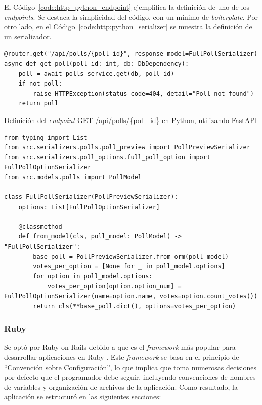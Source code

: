 \documentclass[11pt]{article}
\let\Oldsubsubsection\subsubsection
\renewcommand{\subsubsection}{\FloatBarrier\Oldsubsubsection}
\newcommand{\english}[1]{\textit{#1}}
\begin{document}
El Código~\ref{code:http_python_endpoint} ejemplifica la definición de uno de los \english{endpoints}. Se destaca la simplicidad del código, con un mínimo de \english{boilerplate}. Por otro lado, en el Código~\ref{code:http:python_serializer} se muestra la definición de un serializador.

\begin{listing}[h]
\begin{verbatim}
@router.get("/api/polls/{poll_id}", response_model=FullPollSerializer)
async def get_poll(poll_id: int, db: DbDependency):
    poll = await polls_service.get(db, poll_id)
    if not poll:
        raise HTTPException(status_code=404, detail="Poll not found")
    return poll
\end{verbatim}
\caption{Definición del \english{endpoint} GET /api/polls/\{poll\_id\} en Python, utilizando FastAPI}
\label{code:http_python_endpoint}
\end{listing}

\begin{listing}[h]
\begin{verbatim}
from typing import List
from src.serializers.polls.poll_preview import PollPreviewSerializer
from src.serializers.poll_options.full_poll_option import FullPollOptionSerializer
from src.models.polls import PollModel

class FullPollSerializer(PollPreviewSerializer):
    options: List[FullPollOptionSerializer]

    @classmethod
    def from_model(cls, poll_model: PollModel) -> "FullPollSerializer":
        base_poll = PollPreviewSerializer.from_orm(poll_model)
        votes_per_option = [None for _ in poll_model.options]
        for option in poll_model.options:
            votes_per_option[option.option_num] = FullPollOptionSerializer(name=option.name, votes=option.count_votes())
        return cls(**base_poll.dict(), options=votes_per_option)
\end{verbatim}
\caption{Definición de un Serializador en Python, utilizando \lstinline{pydantic}}
\label{code:http:python_serializer}
\end{listing}

\subsubsection{Ruby}

Se optó por Ruby on Rails debido a que es el \english{framework} más popular para desarrollar aplicaciones en Ruby \cite{http:ruby_top_100}. Este \english{framework} se basa en el principio de ``Convención sobre Configuración'', lo que implica que toma numerosas decisiones por defecto que el programador debe seguir, incluyendo convenciones de nombres de variables y organización de archivos de la aplicación. Como resultado, la aplicación se estructuró en las siguientes secciones:
\end{document}
